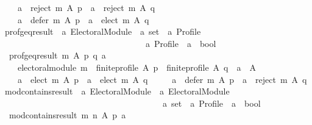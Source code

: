 \begin{isabellebody}
\ \ \ \ {\isacharparenleft}{\kern0pt}a\ {\isasymin}\ reject\ m\ A\ p\ {\isasymlongrightarrow}\ a\ {\isasymin}\ reject\ m\ A\ q{\isacharparenright}{\kern0pt}\ {\isasymand}\isanewline
\ \ \ \ {\isacharparenleft}{\kern0pt}a\ {\isasymin}\ defer\ m\ A\ p\ {\isasymlongrightarrow}\ a\ {\isasymnotin}\ elect\ m\ A\ q{\isacharparenright}{\kern0pt}{\isachardoublequoteclose}\isanewline
\isanewline
{}\isamarkupfalse%
\ prof{\isacharunderscore}{\kern0pt}geq{\isacharunderscore}{\kern0pt}result\ {\isacharcolon}{\kern0pt}{\isacharcolon}{\kern0pt}\ {\isachardoublequoteopen}{\isacharprime}{\kern0pt}a\ Electoral{\isacharunderscore}{\kern0pt}Module\ {\isasymRightarrow}\ {\isacharprime}{\kern0pt}a\ set\ {\isasymRightarrow}\ {\isacharprime}{\kern0pt}a\ Profile\ {\isasymRightarrow}\isanewline
\ \ \ \ \ \ \ \ \ \ \ \ \ \ \ \ \ \ \ \ \ \ \ \ \ \ \ \ \ \ \ \ \ \ {\isacharprime}{\kern0pt}a\ Profile\ {\isasymRightarrow}\ {\isacharprime}{\kern0pt}a\ {\isasymRightarrow}\ bool{\isachardoublequoteclose}\ \isanewline
\ \ {\isachardoublequoteopen}prof{\isacharunderscore}{\kern0pt}geq{\isacharunderscore}{\kern0pt}result\ m\ A\ p\ q\ a\ {\isasymequiv}\isanewline
\ \ \ \ electoral{\isacharunderscore}{\kern0pt}module\ m\ {\isasymand}\ finite{\isacharunderscore}{\kern0pt}profile\ A\ p\ {\isasymand}\ finite{\isacharunderscore}{\kern0pt}profile\ A\ q\ {\isasymand}\ a\ {\isasymin}\ A\ {\isasymand}\isanewline
\ \ \ \ {\isacharparenleft}{\kern0pt}a\ {\isasymin}\ elect\ m\ A\ p\ {\isasymlongrightarrow}\ a\ {\isasymin}\ elect\ m\ A\ q{\isacharparenright}{\kern0pt}\ {\isasymand}\isanewline
\ \ \ \ {\isacharparenleft}{\kern0pt}a\ {\isasymin}\ defer\ m\ A\ p\ {\isasymlongrightarrow}\ a\ {\isasymnotin}\ reject\ m\ A\ q{\isacharparenright}{\kern0pt}{\isachardoublequoteclose}\isanewline
\isanewline
{}\isamarkupfalse%
\ mod{\isacharunderscore}{\kern0pt}contains{\isacharunderscore}{\kern0pt}result\ {\isacharcolon}{\kern0pt}{\isacharcolon}{\kern0pt}\ {\isachardoublequoteopen}{\isacharprime}{\kern0pt}a\ Electoral{\isacharunderscore}{\kern0pt}Module\ {\isasymRightarrow}\ {\isacharprime}{\kern0pt}a\ Electoral{\isacharunderscore}{\kern0pt}Module\ {\isasymRightarrow}\isanewline
\ \ \ \ \ \ \ \ \ \ \ \ \ \ \ \ \ \ \ \ \ \ \ \ \ \ \ \ \ \ \ \ \ \ \ \ \ \ {\isacharprime}{\kern0pt}a\ set\ {\isasymRightarrow}\ {\isacharprime}{\kern0pt}a\ Profile\ {\isasymRightarrow}\ {\isacharprime}{\kern0pt}a\ {\isasymRightarrow}\ bool{\isachardoublequoteclose}\ \isanewline
\ \ {\isachardoublequoteopen}mod{\isacharunderscore}{\kern0pt}contains{\isacharunderscore}{\kern0pt}result\ m\ n\ A\ p\ a\ {\isasymequiv}\isanewline

\end{isabellebody}
